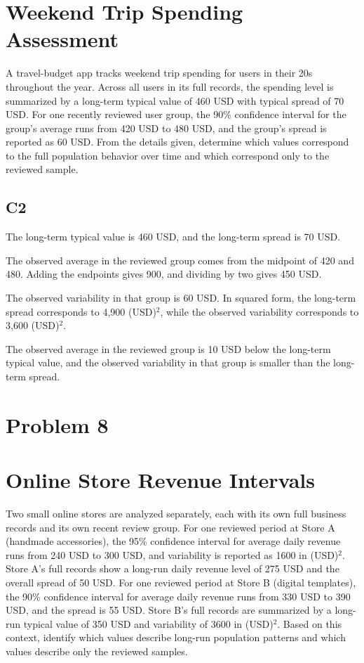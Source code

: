 \begin{ExamProblems}
		\section{Weekend Trip Spending Assessment}
		A travel-budget app tracks weekend trip spending for users in their 20s throughout the year.
		Across all users in its full records, the spending level is summarized by a long-term typical value of 460 USD with typical spread of 70 USD.
		For one recently reviewed user group, the 90\% confidence interval for the group's average runs from 420 USD to 480 USD, and the group's spread is reported as 60 USD.
		From the details given, determine which values correspond to the full population behavior over time and which correspond only to the reviewed sample.

\subsection*{C2}
		The long-term typical value is 460 USD, and the long-term spread is 70 USD.

		The observed average in the reviewed group comes from the midpoint of 420 and 480.
		Adding the endpoints gives 900, and dividing by two gives 450 USD.

		The observed variability in that group is 60 USD.
		In squared form, the long-term spread corresponds to 4,900 (USD)$^2$, while the observed variability corresponds to 3,600 (USD)$^2$.

		The observed average in the reviewed group is 10 USD below the long-term typical value, and the observed variability in that group is smaller than the long-term spread.


		\newpage
		\item
		\section{Problem 8}
		\section{Online Store Revenue Intervals}
		Two small online stores are analyzed separately, each with its own full business records and its own recent review group.
		For one reviewed period at Store A (handmade accessories), the 95\% confidence interval for average daily revenue runs from 240 USD to 300 USD, and variability is reported as 1600 in (USD)$^2$.
		Store A's full records show a long-run daily revenue level of 275 USD and the overall spread of 50 USD.
		For one reviewed period at Store B (digital templates), the 90\% confidence interval for average daily revenue runs from 330 USD to 390 USD, and the spread is 55 USD.
		Store B's full records are summarized by a long-run typical value of 350 USD and variability of 3600 in (USD)$^2$.
		Based on this context, identify which values describe long-run population patterns and which values describe only the reviewed samples.


\end{ExamProblems}
